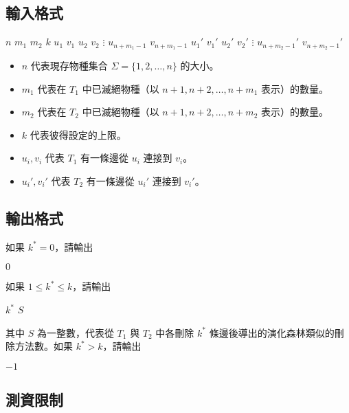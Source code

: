 \subsection{輸入格式}

\begin{format}
\f{
$n$ $m_1$ $m_2$ $k$
$u_1$ $v_1$
$u_2$ $v_2$
$\vdots$
$u_{n+m_1-1}$ $v_{n+m_1-1}$
$u_1'$ $v_1'$
$u_2'$ $v_2'$
$\vdots$
$u_{n+m_2-1}'$ $v_{n+m_2-1}'$
}
\end{format}

\begin{itemize}
\tightlist
\item
  \(n\) 代表現存物種集合 \(\Sigma = \{1, 2, \ldots, n\}\) 的大小。
\item
  \(m_1\) 代表在 \(T_1\) 中已滅絕物種（以 \(n+1, n+2, \ldots, n+m_1\)
  表示）的數量。
\item
  \(m_2\) 代表在 \(T_2\) 中已滅絕物種（以 \(n+1, n+2, \ldots, n+m_2\)
  表示）的數量。
\item
  \(k\) 代表彼得設定的上限。
\item
  \(u_i, v_i\) 代表 \(T_1\) 有一條邊從 \(u_i\) 連接到 \(v_i\)。
\item
  \(u_i', v_i'\) 代表 \(T_2\) 有一條邊從 \(u_i'\) 連接到 \(v_i'\)。
\end{itemize}

\subsection{輸出格式}

如果 \(k^* = 0\)，請輸出

\begin{format}
\f{
$0$
}
\end{format}

如果 \(1 \le k^* \le k\)，請輸出

\begin{format}
\f{
$k^*$
$S$
}
\end{format}

\noindent 其中 \(S\) 為一整數，代表從 \(T_1\) 與 \(T_2\) 中各刪除
\(k^*\) 條邊後導出的演化森林類似的刪除方法數。如果 \(k^* > k\)，請輸出

\begin{format}
\f{
$-1$
}
\end{format}

\subsection{測資限制}

